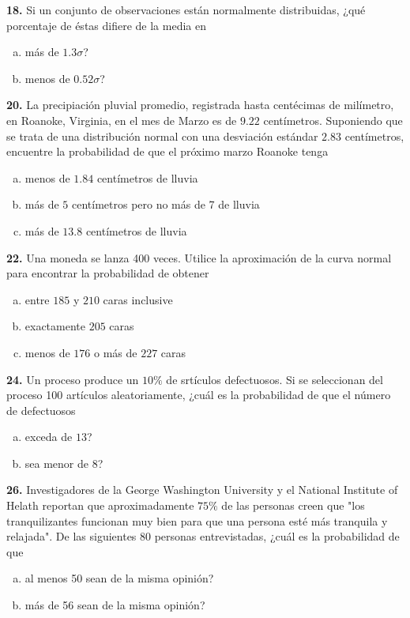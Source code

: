 \documentclass[12pt, letterpaper]{article}
\begin{document}
    \textbf{18. }Si un conjunto de observaciones están normalmente distribuidas, ¿qué porcentaje de éstas difiere de la
    media en
        \begin{enumerate}[a)]
            \item más de $1.3\sigma$?
            \item menos de $0.52\sigma$?
        \end{enumerate}\vskip1cm

    \textbf{20. }La precipiación pluvial promedio, registrada hasta centécimas de milímetro, en Roanoke, Virginia, en el
    mes de Marzo es de $9.22$ centímetros. Suponiendo que se trata de una distribución normal con una desviación estándar
    $2.83$ centímetros, encuentre la probabilidad de que el próximo marzo Roanoke tenga
        \begin{enumerate}[a)]
            \item menos de $1.84$ centímetros de lluvia
            \item más de $5$ centímetros pero no más de 7 de lluvia
            \item más de $13.8$ centímetros de lluvia
        \end{enumerate}\vskip1cm

    \textbf{22. }Una moneda se lanza 400 veces. Utilice la aproximación de la curva normal para encontrar la probabilidad
    de obtener
        \begin{enumerate}[a)]
            \item entre $185$ y $210$ caras inclusive
            \item exactamente $205$ caras
            \item menos de $176$ o más de $227$ caras
        \end{enumerate}\vskip1cm

    \textbf{24. }Un proceso produce un $10\%$ de srtículos defectuosos. Si se seleccionan del proceso 100 artículos
    aleatoriamente, ¿cuál es la probabilidad de que el número de defectuosos
        \begin{enumerate}[a)]
            \item exceda de $13$?
            \item sea menor de $8$?
        \end{enumerate}\vskip1cm

    \textbf{26. }Investigadores de la George Washington University y el National Institute of Helath reportan que
    aproximadamente $75\%$ de las personas creen que "los tranquilizantes funcionan muy bien para que una persona esté
    más tranquila y relajada". De las siguientes 80 personas entrevistadas, ¿cuál es la probabilidad de que
        \begin{enumerate}[a)]
            \item al menos 50 sean de la misma opinión?
            \item más de 56 sean de la misma opinión?
        \end{enumerate}\vskip1cm
\end{document}
